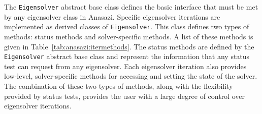 \documentclass[acmtoms]{acmtrans2m}
\newcommand{\aspace}[1]{\texttt{#1}}
\begin{document}

The \aspace{Eigensolver} abstract base class defines the basic interface that must be met
by any eigensolver class in Anasazi. Specific eigensolver iterations are implemented as derived
classes of \aspace{Eigensolver}.  This class
defines two types of methods: status methods and
solver-specific methods. A list of these methods is given in Table~\ref{tab:anasazi:itermethods}.
The status methods are defined by the \aspace{Eigensolver}
abstract base class and represent the information that any status test can request from
any eigensolver.  Each eigensolver iteration also provides low-level, 
solver-specific methods for accessing and setting the state of the solver.
The combination of these two types of methods, along with the flexibility
provided by status tests, provides the user with a large degree of
control over eigensolver iterations.

\end{document}

